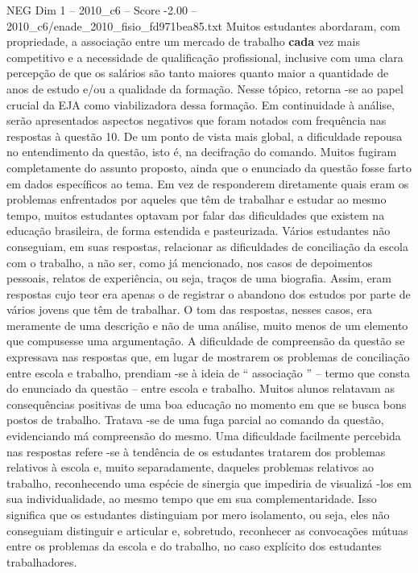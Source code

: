 \begin{textsample}{NEG Dim 1 – 2010\_c6 – Score -2.00 – 2010\_c6/enade\_2010\_fisio\_fd971bea85.txt}
Muitos estudantes abordaram, com propriedade, a associação entre um mercado de trabalho \textbf{cada} vez mais competitivo e a necessidade de qualificação profissional, inclusive com uma clara percepção de que os salários são tanto maiores quanto maior a quantidade de anos de estudo e/ou a qualidade da formação.
Nesse tópico, retorna -se ao papel crucial da EJA como viabilizadora dessa formação.
Em continuidade à análise, serão apresentados aspectos negativos que foram notados com frequência nas respostas à questão 10.
De um ponto de vista mais global, a dificuldade repousa no entendimento da questão, isto é, na decifração do comando.
Muitos fugiram completamente do assunto proposto, ainda que o enunciado da questão fosse farto em dados específicos ao tema.
Em vez de responderem diretamente quais eram os problemas enfrentados por aqueles que têm de trabalhar e estudar ao mesmo tempo, muitos estudantes optavam por falar das dificuldades que existem na educação brasileira, de forma estendida e pasteurizada.
Vários estudantes não conseguiam, em suas respostas, relacionar as dificuldades de conciliação da escola com o trabalho, a não ser, como já mencionado, nos casos de depoimentos pessoais, relatos de experiência, ou seja, traços de uma biografia.
Assim, eram respostas cujo teor era apenas o de registrar o abandono dos estudos por parte de vários jovens que têm de trabalhar.
O tom das respostas, nesses casos, era meramente de uma descrição e não de uma análise, muito menos de um elemento que compusesse uma argumentação.
A dificuldade de compreensão da questão se expressava nas respostas que, em lugar de mostrarem os problemas de conciliação entre escola e trabalho, prendiam -se à ideia de “ associação ” – termo que consta do enunciado da questão – entre escola e trabalho.
Muitos alunos relatavam as consequências positivas de uma boa educação no momento em que se busca bons postos de trabalho.
Tratava -se de uma fuga parcial ao comando da questão, evidenciando má compreensão do mesmo.
Uma dificuldade facilmente percebida nas respostas refere -se à tendência de os estudantes tratarem dos problemas relativos à escola e, muito separadamente, daqueles problemas relativos ao trabalho, reconhecendo uma espécie de sinergia que impediria de visualizá -los em sua individualidade, ao mesmo tempo que em sua complementaridade.
Isso significa que os estudantes distinguiam por mero isolamento, ou seja, eles não conseguiam distinguir e articular e, sobretudo, reconhecer as convocações mútuas entre os problemas da escola e do trabalho, no caso explícito dos estudantes trabalhadores.

\end{textsample}
